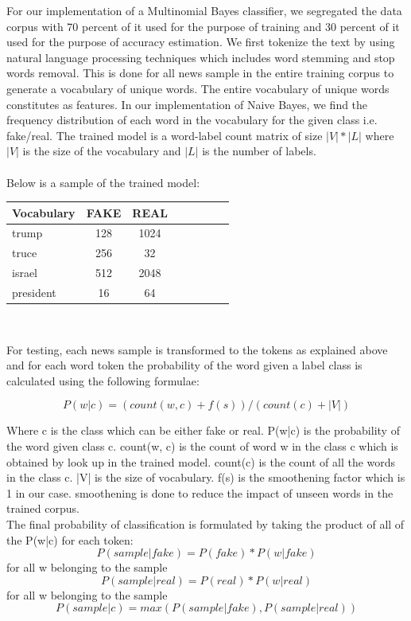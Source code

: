 \documentclass{neu_handout}
\begin{document}
For our implementation of a Multinomial Bayes classifier, we segregated the data corpus with 70 percent of it used for the purpose of training and 30 percent of it used for the purpose of accuracy estimation. We first tokenize the text by using  natural language processing techniques which includes word stemming and stop words removal. This is done for all news sample in the entire training corpus to generate a vocabulary of unique words. The entire vocabulary of unique words constitutes as features. In our implementation of Naive Bayes, we find the frequency distribution of each word in the vocabulary for the given class i.e. fake/real. The trained model is a word-label count matrix of size $|V|*|L|$ where $|V|$ is the size of the vocabulary and $|L|$ is the number of labels. \\\\

Below is a sample of the trained model:

\begin{table}[h]
\centering
\begin{tabular}{l*{6}{c}r}
Vocabulary     & FAKE & REAL \\
\hline
trump 			& 128 & 1024   \\
truce            & 256 & 32  \\
israel           & 512 & 2048  \\
president     & 16 & 64  \\
\end{tabular}\\
\end{table}

For testing, each news sample is transformed to the tokens as explained above and for each word token the probability of the word given a label class is calculated using the following formulae:

$$P(w|c) = (count(w, c) + f(s))/(count(c) + |V|)$$

Where c is the class which can be either fake or real. P(w|c) is the probability of the word given class c. count(w, c) is the count of word w in the class c which is obtained by look up in the trained model. count(c) is the count of all the words in the class c. |V| is the size of vocabulary. f(s) is the smoothening factor  which is 1 in our case. smoothening is done to reduce the impact of unseen words in the trained corpus.\\

The final probability of classification is formulated by taking the product of all of the P(w|c) for each token:\\
$$P(sample|fake) = P(fake) * P(w|fake)$$ for all w belonging to the sample
$$P(sample|real) = P(real) * P(w|real)$$ for all w belonging to the sample
$$P(sample|c) = max(P(sample|fake), P(sample|real))$$
\end{document}
